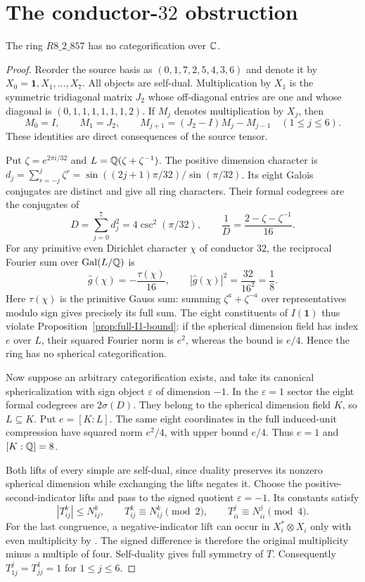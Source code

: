 \section{The conductor-\texorpdfstring{$32$}{32} obstruction}
\label{sec:r857-conductor}

\begin{theorem}\label{thm:r857-general}
The ring $R8\_2\_857$ has no categorification over $\mathbb C$.
\end{theorem}
\begin{proof}
Reorder the source basis as $(0,1,7,2,5,4,3,6)$ and denote it by
$X_0=\mathbf1,X_1,\ldots,X_7$.  All objects are self-dual.
Multiplication by $X_1$ is the symmetric tridiagonal matrix $J_2$
whose off-diagonal entries are one and whose diagonal is
$(0,1,1,1,1,1,1,2)$.  If $M_j$ denotes multiplication by $X_j$, then
\[
 M_0=I,\qquad M_1=J_2,\qquad
 M_{j+1}=(J_2-I)M_j-M_{j-1}\quad(1\leq j\leq6).
\]
These identities are direct consequences of the source tensor.

Put $\zeta=e^{2\pi i/32}$ and $L=\mathbb Q(\zeta+\zeta^{-1})$.
The positive dimension character is
$d_j=\sum_{r=-j}^{j}\zeta^r
=\sin((2j+1)\pi/32)/\sin(\pi/32)$.
Its eight Galois conjugates are distinct and give all ring characters.
Their formal codegrees are the conjugates of
\[
 D=\sum_{j=0}^7d_j^2=4\csc^2(\pi/32),
 \qquad \frac1D=\frac{2-\zeta-\zeta^{-1}}{16}.
\]
For any primitive even Dirichlet character $\chi$ of conductor $32$,
the reciprocal Fourier sum over $\operatorname{Gal}(L/\mathbb Q)$ is
\[
 \widehat g(\chi)=-\frac{\tau(\chi)}{16},
 \qquad |\widehat g(\chi)|^2=\frac{32}{16^2}=\frac18.
\]
Here $\tau(\chi)$ is the primitive Gauss sum: summing
$\zeta^a+\zeta^{-a}$ over representatives modulo sign gives precisely
its full sum.  The eight constituents of $I(\mathbf1)$ thus violate
Proposition~\ref{prop:full-I1-bound}: if the spherical dimension field
has index $e$ over $L$, their squared Fourier norm is $e^2$, whereas
the bound is $e/4$.  Hence the ring has no spherical categorification.

Now suppose an arbitrary categorification exists, and take its
canonical sphericalization with sign object $\varepsilon$ of dimension
$-1$.  In the $\varepsilon=1$ sector the eight formal codegrees are
$2\sigma(D)$.  They belong to the spherical dimension field $K$, so
$L\subseteq K$.  Put $e=[K:L]$.  The same eight coordinates in the
full induced-unit compression have squared norm $e^2/4$, with upper
bound $e/4$.  Thus $e=1$ and $[K:\mathbb Q]=8$.

Both lifts of every simple are self-dual, since duality preserves its
nonzero spherical dimension while exchanging the lifts negates it.
Choose the positive-second-indicator lifts and pass to the signed
quotient $\varepsilon=-1$.  Its constants satisfy
\[
 |T_{ij}^{k}|\leq N_{ij}^{k},\qquad
 T_{ij}^{k}\equiv N_{ij}^{k}\pmod2,\qquad
 T_{ii}^{j}\equiv N_{ii}^{j}\pmod4.
\]
For the last congruence, a negative-indicator lift can occur in
$X_i^*\otimes X_i$ only with even multiplicity by
\cite[Theorem~3.9]{TPEParity}.  The signed difference is therefore
the original multiplicity minus a multiple of four.
Self-duality gives full symmetry of $T$.  Consequently
$T_{1j}^{j}=T_{jj}^{1}=1$ for $1\leq j\leq6$.


\end{proof}
